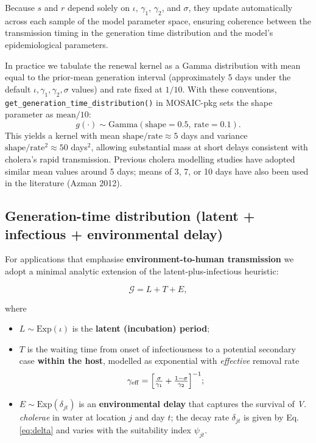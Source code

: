 \documentclass[
]{book}
\providecommand{\tightlist}{%
  \setlength{\itemsep}{0pt}\setlength{\parskip}{0pt}}
\begin{document}
Because \(s\) and \(r\) depend solely on \(\iota,\,\gamma_{1},\,\gamma_{2}\), and \(\sigma\), they update automatically across each sample of the model parameter space, ensuring coherence between the transmission timing in the generation time distribution and the model's epidemiological parameters.

In practice we tabulate the renewal kernel as a Gamma distribution with mean equal to the prior-mean generation interval (approximately 5 days under the default \(\iota, \gamma_1, \gamma_2, \sigma\) values) and rate fixed at \(1/10\). With these conventions, \texttt{get\_generation\_time\_distribution()} in MOSAIC-pkg sets the shape parameter as \(\text{mean}/10\):
\begin{equation}
g(\cdot) \sim \text{Gamma}(\text{shape} = 0.5,\ \text{rate} = 0.1).
\label{eq:generation-time}
\end{equation}
This yields a kernel with mean \(\text{shape}/\text{rate} \approx 5\) days and variance \(\text{shape}/\text{rate}^2 \approx 50\) days\(^2\), allowing substantial mass at short delays consistent with cholera's rapid transmission. Previous cholera modelling studies have adopted similar mean values around 5 days; means of 3, 7, or 10 days have also been used in the literature (Azman 2012).

\subsection{Generation-time distribution (latent + infectious + environmental delay)}\label{generation-time-distribution-latent-infectious-environmental-delay}

For applications that emphasise \textbf{environment-to-human transmission} we adopt a
minimal analytic extension of the latent-plus-infectious heuristic:

\[
\mathcal{G}=L+T+E ,
\]

where

\begin{itemize}
\tightlist
\item
  \(L\sim\mathrm{Exp}(\iota)\) is the \textbf{latent (incubation) period};\\
\item
  \(T\) is the waiting time from onset of infectiousness to a potential secondary case \textbf{within the host}, modelled as exponential with \emph{effective} removal rate\\
  \[
  \gamma_{\mathrm{eff}}
    =\Bigl[\tfrac{\sigma}{\gamma_{1}}+\tfrac{1-\sigma}{\gamma_{2}}\Bigr]^{-1};
  \]
\item
  \(E\sim\mathrm{Exp}(\delta_{jt})\) is an \textbf{environmental delay} that captures the survival of \emph{V.} \emph{cholerae} in water at location \(j\) and day \(t\); the decay rate \(\delta_{jt}\) is given by Eq. \eqref{eq:delta} and varies with the suitability index \(\psi_{jt}\).
\end{itemize}
\end{document}
